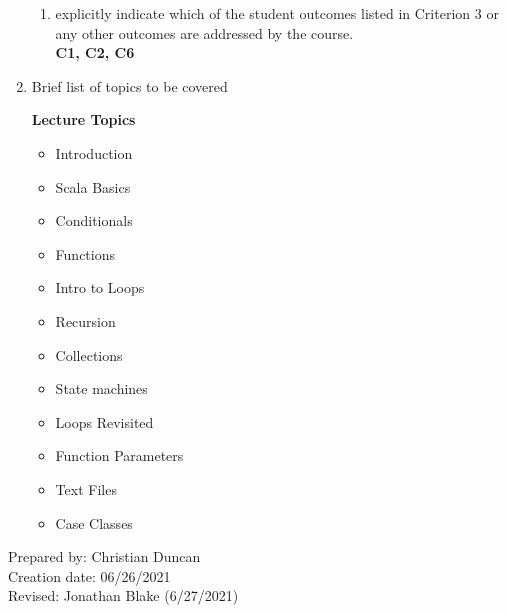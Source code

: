 \begin{enumerate}[1.]
\begin{enumerate}
\item explicitly indicate which of the student outcomes listed in Criterion 3 or any other outcomes are addressed by the course.\\
  {\bfseries
    C1,
    C2,
    C6
  }
\end{enumerate}

\item Brief list of topics to be covered\\
  {\bfseries
    Lecture Topics
    \begin{itemize}
      \item Introduction
      \item Scala Basics
      \item Conditionals
      \item Functions
      \item Intro to Loops
      \item Recursion
      \item Collections
      \item State machines
      \item Loops Revisited
      \item Function Parameters
      \item Text Files
      \item Case Classes
    \end{itemize}
  }

\end{enumerate}

\noindent Prepared by: Christian Duncan\\
\noindent Creation date: 06/26/2021\\
\noindent Revised: Jonathan Blake (6/27/2021)\\
